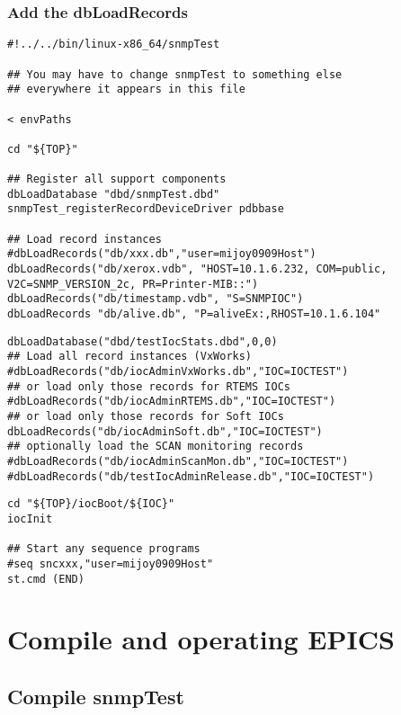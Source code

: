 \documentclass[11pt
  , a4paper
  , article
  , oneside
]{memoir}
\begin{document}
\subsection{Add the dbLoadRecords}
\begin{lstlisting}[style=termstyle]
#!../../bin/linux-x86_64/snmpTest

## You may have to change snmpTest to something else
## everywhere it appears in this file

< envPaths

cd "${TOP}"

## Register all support components
dbLoadDatabase "dbd/snmpTest.dbd"
snmpTest_registerRecordDeviceDriver pdbbase

## Load record instances
#dbLoadRecords("db/xxx.db","user=mijoy0909Host")
dbLoadRecords("db/xerox.vdb", "HOST=10.1.6.232, COM=public, V2C=SNMP_VERSION_2c, PR=Printer-MIB::")
dbLoadRecords("db/timestamp.vdb", "S=SNMPIOC")
dbLoadRecords "db/alive.db", "P=aliveEx:,RHOST=10.1.6.104"
\end{lstlisting}
\begin{lstlisting}[style=termstyle]
dbLoadDatabase("dbd/testIocStats.dbd",0,0)
## Load all record instances (VxWorks)
#dbLoadRecords("db/iocAdminVxWorks.db","IOC=IOCTEST")
## or load only those records for RTEMS IOCs
#dbLoadRecords("db/iocAdminRTEMS.db","IOC=IOCTEST")
## or load only those records for Soft IOCs
dbLoadRecords("db/iocAdminSoft.db","IOC=IOCTEST")
## optionally load the SCAN monitoring records
#dbLoadRecords("db/iocAdminScanMon.db","IOC=IOCTEST")
#dbLoadRecords("db/testIocAdminRelease.db","IOC=IOCTEST")
\end{lstlisting}
\begin{lstlisting}[style=termstyle]
cd "${TOP}/iocBoot/${IOC}"
iocInit

## Start any sequence programs
#seq sncxxx,"user=mijoy0909Host"
st.cmd (END)
\end{lstlisting}
\chapter{Compile and operating EPICS}
\section{Compile snmpTest}
\end{document}

